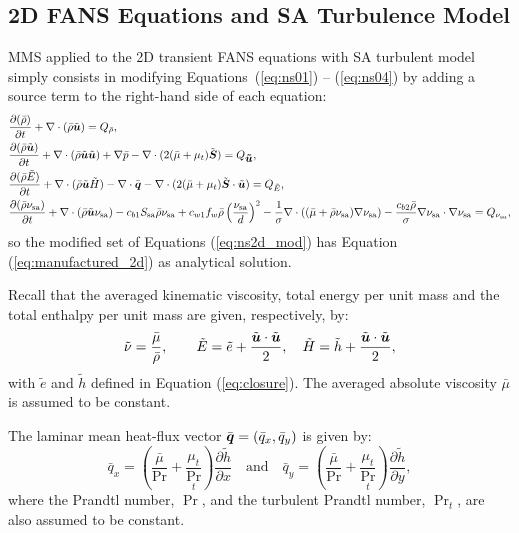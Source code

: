\documentclass[10pt]{article}
\newcommand{\Diff}[2] {\dfrac{\partial( #1)}{\partial #2}}
\newcommand{\diff}[2] {\dfrac{\partial #1}{\partial #2}}
\newcommand{\bv}[1]{\ensuremath{\mbox{\boldmath$ #1 $}}}
\newcommand{\sa}{\nu_{\mathrm{sa}}}
\newcommand{\tsa}{\mathrm{sa}}
\newcommand{\brho}{\bar{\rho}}
\newcommand{\tu}{\tilde{u}}
\newcommand{\tE}{\tilde{E}}
\newcommand{\bmu}{\bar{\mu}}
\begin{document}
 \subsection{2D FANS Equations and SA Turbulence Model}\label{NS+SA}



MMS applied to the 2D transient FANS equations with SA turbulent model simply consists in modifying Equations~(\ref{eq:ns01}) -- (\ref{eq:ns04}) by adding a source term to the right-hand side of each equation:
 \begin{equation}
 \begin{split} \label{eq:ns2d_mod}
 &\Diff{\bar{\rho}}{t} +\nabla \cdot \left(\bar{\rho} \tilde{\bv{u}}\right) = Q_{\brho},\\
 &\Diff{\bar{\rho} \tilde{\bv{u}}}{t} +\nabla\cdot\left(\bar{\rho} \tilde{\bv{u}}\tilde{\bv{u}}\right) +\nabla \bar{p} -  \nabla \cdot ( 2(\bmu+\mu_t) \tilde{\bv{S}} )= Q_{\bv{\tu}},\\
 & \Diff{\bar{\rho} \tilde{E}}{t}+ \nabla \cdot (\bar{\rho} \tilde{\bv{u}} \tilde{H})-\nabla \cdot \bar{\bv{q}} - \nabla\cdot(2 (\bmu+\mu_t) \tilde{\bv{S}} \cdot \tilde{\bv{u}})= Q_{\tE},\\
 &\Diff{\bar{\rho} \sa}{t} +\nabla \cdot (\bar{\rho} \tilde{\bv{u}} \sa) - c_{b1} S_\tsa \bar{\rho} \sa +c_{w1} f_w \brho \left(\dfrac{\sa}{d}\right)^2 - \dfrac{1}{\sigma}\nabla \cdot \left( (\bmu+\bar{\rho}  \sa) \nabla \sa\right) -\dfrac{c_{b2} \bar{\rho} }{\sigma} \nabla \sa \cdot \nabla \sa =Q_{\sa},
 \end{split}
 \end{equation}
so the modified set of Equations (\ref{eq:ns2d_mod}) has Equation (\ref{eq:manufactured_2d}) as analytical solution.

Recall that the averaged kinematic viscosity, total energy per unit mass and the total enthalpy per unit mass are given, respectively, by:
\begin{equation}
 \begin{split}\label{eq:closure01}
  \tilde{\nu}=\dfrac{\bar{\mu}}{\bar{\rho}},\qquad \tilde{E}=\tilde{e}+\dfrac{\tilde{\bv{u}}\cdot \tilde{\bv{u}}}{2}, \quad \tilde{H}=\tilde{h}+\dfrac{\tilde{\bv{u}}\cdot \tilde{\bv{u}}}{2},
 \end{split}
\end{equation}
with $\tilde{e}$ and $\tilde{h}$ defined in Equation (\ref{eq:closure}). The averaged absolute viscosity $\bmu$ is assumed to be constant.

 The laminar mean heat-flux vector $\bar{\bv{q}}=(\bar{q}_x,\bar{q}_y)$ is given by:
%
\begin{equation}\label{eq:closure02}
 \bar{q}_x = \left(\dfrac{\bar{\mu}}{\Pr}+\dfrac{\mu_t}{\Pr_t}\right)\diff{\tilde{h}}{x}\quad \mbox{and} \quad \bar{q}_y = \left(\dfrac{\bar{\mu}}{\Pr}+\dfrac{\mu_t}{\Pr_t}\right)\diff{\tilde{h}}{y},
 \end{equation}
where the Prandtl number, $\Pr$, and the turbulent Prandtl number, $\Pr_t$, are also assumed to be constant.
\end{document}
